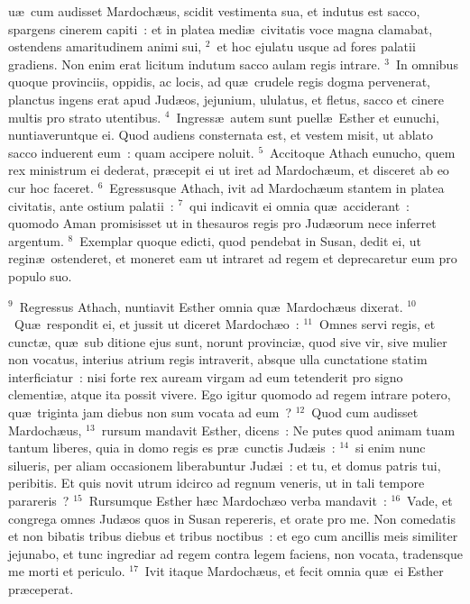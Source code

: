 \bchapter
{}u\ae\ cum audisset Mardoch\ae us, scidit vestimenta sua, et indutus est sacco, spargens cinerem capiti~: et in platea medi\ae\ civitatis voce magna clamabat, ostendens amaritudinem animi sui,
${}^{2}$~et hoc ejulatu usque ad fores palatii gradiens. Non enim erat licitum indutum sacco aulam regis intrare.
${}^{3}$~In omnibus quoque provinciis, oppidis, ac locis, ad qu\ae\ crudele regis dogma pervenerat, planctus ingens erat apud Jud\ae os, jejunium, ululatus, et fletus, sacco et cinere multis pro strato utentibus.
${}^{4}$~Ingress\ae\ autem sunt puell\ae\ Esther et eunuchi, nuntiaveruntque ei. Quod audiens consternata est, et vestem misit, ut ablato sacco induerent eum~: quam accipere noluit.
${}^{5}$~Accitoque Athach eunucho, quem rex ministrum ei dederat, pr\ae cepit ei ut iret ad Mardoch\ae um, et disceret ab eo cur hoc faceret.
${}^{6}$~Egressusque Athach, ivit ad Mardoch\ae um stantem in platea civitatis, ante ostium palatii~:
${}^{7}$~qui indicavit ei omnia qu\ae\ acciderant~: quomodo Aman promisisset ut in thesauros regis pro Jud\ae orum nece inferret argentum.
${}^{8}$~Exemplar quoque edicti, quod pendebat in Susan, dedit ei, ut regin\ae\ ostenderet, et moneret eam ut intraret ad regem et deprecaretur eum pro populo suo.


${}^{9}$~Regressus Athach, nuntiavit Esther omnia qu\ae\ Mardoch\ae us dixerat.
${}^{10}$~Qu\ae\ respondit ei, et jussit ut diceret Mardoch\ae o~:
${}^{11}$~Omnes servi regis, et cunct\ae , qu\ae\ sub ditione ejus sunt, norunt provinci\ae , quod sive vir, sive mulier non vocatus, interius atrium regis intraverit, absque ulla cunctatione statim interficiatur~: nisi forte rex auream virgam ad eum tetenderit pro signo clementi\ae , atque ita possit vivere. Ego igitur quomodo ad regem intrare potero, qu\ae\ triginta jam diebus non sum vocata ad eum~?
${}^{12}$~Quod cum audisset Mardoch\ae us,
${}^{13}$~rursum mandavit Esther, dicens~: Ne putes quod animam tuam tantum liberes, quia in domo regis es pr\ae\ cunctis Jud\ae is~:
${}^{14}$~si enim nunc silueris, per aliam occasionem liberabuntur Jud\ae i~: et tu, et domus patris tui, peribitis. Et quis novit utrum idcirco ad regnum veneris, ut in tali tempore parareris~?
${}^{15}$~Rursumque Esther h\ae c Mardoch\ae o verba mandavit~:
${}^{16}$~Vade, et congrega omnes Jud\ae os quos in Susan repereris, et orate pro me. Non comedatis et non bibatis tribus diebus et tribus noctibus~: et ego cum ancillis meis similiter jejunabo, et tunc ingrediar ad regem contra legem faciens, non vocata, tradensque me morti et periculo.
${}^{17}$~Ivit itaque Mardoch\ae us, et fecit omnia qu\ae\ ei Esther pr\ae ceperat.

